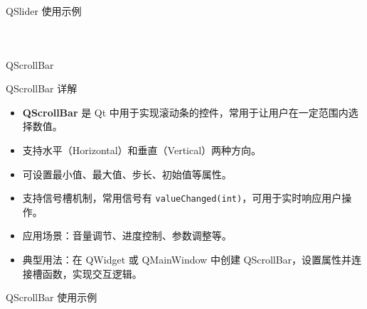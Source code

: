 \documentclass[UTF8,aspectratio=169]{beamer}
\begin{document}
\begin{frame}[fragile]{QSlider 使用示例}
    \begin{columns}
        \begin{column}{0.48\textwidth}
            \inputminted[firstline=1,lastline=19]{cpp}{code/qt_slider_example.cpp}
        \end{column}
        \begin{column}{0.48\textwidth}
            \inputminted[firstline=20,lastline=36]{cpp}{code/qt_slider_example.cpp}
        \end{column}
    \end{columns}
\end{frame}

\begin{frame}{QScrollBar}
    \begin{ytublock}{QScrollBar 详解}
        \begin{itemize}
            \item \textbf{QScrollBar} 是 Qt 中用于实现滚动条的控件，常用于让用户在一定范围内选择数值。
            \item 支持水平（Horizontal）和垂直（Vertical）两种方向。
            \item 可设置最小值、最大值、步长、初始值等属性。
            \item 支持信号槽机制，常用信号有 \texttt{valueChanged(int)}，可用于实时响应用户操作。
            \item 应用场景：音量调节、进度控制、参数调整等。
            \item 典型用法：在 QWidget 或 QMainWindow 中创建 QScrollBar，设置属性并连接槽函数，实现交互逻辑。
        \end{itemize}
    \end{ytublock}
\end{frame}

\begin{frame}[fragile]{QScrollBar 使用示例}
    \begin{columns}
        \begin{column}{0.48\textwidth}
            \inputminted[firstline=1,lastline=17]{cpp}{code/qt_scrollbar_example.cpp}
        \end{column}
        \begin{column}{0.48\textwidth}
            \inputminted[firstline=18,lastline=31]{cpp}{code/qt_scrollbar_example.cpp}
        \end{column}
    \end{columns}
\end{frame}
\end{document}
